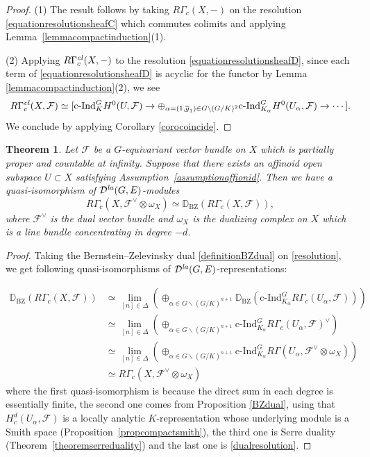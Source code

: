 \documentclass[a4paper,10pt]{amsart}
\newtheorem{theorem}{Theorem}[section]
\theoremstyle{remark}
\theoremstyle{definition}
\theoremstyle{plain}
\numberwithin{equation}{section}
\newcommand{\bbD}{{\mathbb D}}
\newcommand{\calD}{{\mathcal D}}
\newcommand{\calF}{{\mathcal F}}
\newcommand{\ovg}{{\overline g}}
\newcommand{\la}{{\it la}}
\newcommand{\cInd}{\mathrm{c\text{-}Ind}}
\newcommand{\BZ}{\ensuremath{\mathrm{BZ}}}
\begin{document}
\begin{proof}
	(1) The result follows by taking $R\Gamma_c(X,-)$ on the resolution \eqref{equationresolutionsheafC} which commutes colimits and applying Lemma~\ref{lemmacompactinduction}(1).

	(2) Applying $R\Gamma^{\it cl}_c(X,-)$ to the resolution \eqref{equationresolutionsheafD}, since each term of \eqref{equationresolutionsheafD} is acyclic for the functor by Lemma \ref{lemmacompactinduction}(2), we see 
	\[R\Gamma_c^{\it cl}(X,\calF)\simeq [\cInd_{K}^GH^0(U,\calF)\rightarrow \oplus_{\alpha=(1,\ovg_1)\in G\backslash (G/K)^2}\cInd_{K_{\alpha}}^G H^0(U_{\alpha},\calF)\to \cdots].\]
	We conclude by applying Corollary \ref{corocoincide}.
\end{proof}
\begin{theorem}\label{maintheorem}
	Let $\calF$ be a $G$-equivariant vector bundle on $X$ which is partially proper and countable at infinity. Suppose that there exists an affinoid open subspace $U\subset X$ satisfying Assumption~\ref{assumptionaffionid}. Then we have a quasi-isomorphism of $\calD^{\la}(G,E)$-modules 
	$$R\Gamma_c(X,\calF^\vee\otimes\omega_X)\simeq \bbD_{\BZ}(R\Gamma_c(X,\calF)),$$
	where $\calF^{\vee}$ is the dual vector bundle and $\omega_X$ is the dualizing complex on $X$ which is a line bundle concentrating in degree $-d$.
\end{theorem}
\begin{proof}

Taking the Bernstein--Zelevinsky dual \eqref{definitionBZdual} on \eqref{resolution}, we get following quasi-isomorphisms of $\calD^{\la}(G,E)$-representations:

$$\begin{aligned}
\bbD_{\BZ}(R\Gamma_c(X,\calF))& \simeq \lim_{[n]\in\Delta}(\oplus_{\alpha\in G\backslash (G/K)^{n+1}} \bbD_{\BZ}(\cInd_{K_\alpha}^G R\Gamma_c(U_{\alpha},\calF))) \\
&\simeq \lim_{[n]\in\Delta}(\oplus_{\alpha\in G\backslash (G/K)^{n+1}} \cInd^{G}_{K_{\alpha}} R\Gamma_c(U_\alpha,\calF)^\vee)\\
&\simeq \lim_{[n]\in\Delta}(\oplus_{\alpha\in G\backslash (G/K)^{n+1}} \cInd^{G}_{K_{\alpha}} R\Gamma(U_\alpha,\calF^\vee\otimes \omega_X))\\
&\simeq R\Gamma_c(X,\calF^\vee\otimes \omega_X)
\end{aligned}$$
where the first quasi-isomorphism is because the direct sum in each degree is essentially finite, the second one comes from Proposition \ref{BZdual}, using that $H^d_c(U_\alpha,\calF)$ is a locally analytic $K$-representation whose underlying module is a Smith space (Proposition~\ref{propcompactsmith}), the third one is Serre duality (Theorem~\ref{theoremserreduality}) and the last one is \eqref{dualresolution}.
\end{proof}
\end{document}
